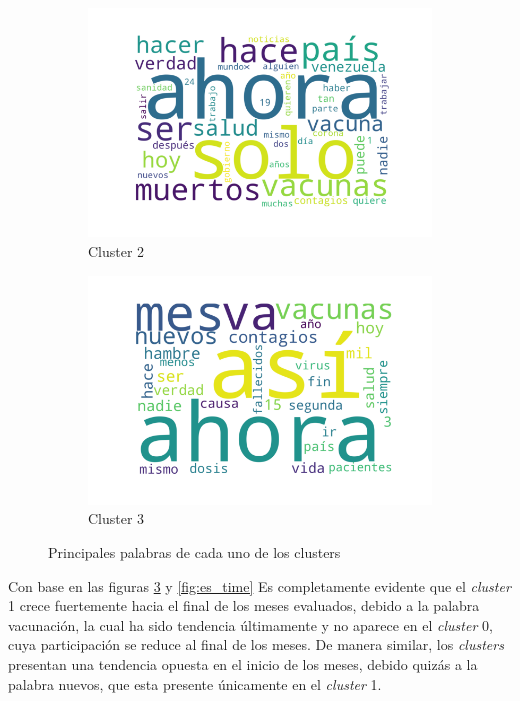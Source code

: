 \begin{figure}
\begin{subfigure}[b]{0.49\textwidth}
        \includegraphics[width=\textwidth]{results/TopicDetection/es/cluster2.png}
        \caption{Cluster 2}
        \label{fig:es_c1}
    \end{subfigure}
    \hfill
    \begin{subfigure}[b]{0.49\textwidth}
        \centering
        \includegraphics[width=\textwidth]{results/TopicDetection/es/cluster3.png}
        \caption{Cluster 3}
        \label{fig:es_c1}
    \end{subfigure}
    \caption{Principales palabras de cada uno de los clusters}
    \label{fig:es_clusters}
\end{figure}

Con base en las figuras \ref{fig:es_clusters} y \ref{fig:es_time} Es completamente evidente que el \textit{cluster} 1 crece fuertemente hacia el final de los meses evaluados, debido a la palabra vacunación, la cual ha sido tendencia últimamente y no aparece en el \textit{cluster} 0, cuya participación se reduce al final de los meses. De manera similar, los \textit{clusters} presentan una tendencia opuesta en el inicio de los meses, debido quizás a la palabra nuevos, que esta presente únicamente en el \textit{cluster} 1.

